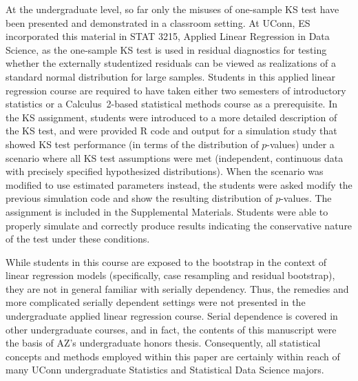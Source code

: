 \documentclass[12pt, letterpaper]{article}
\begin{document}
{%
At the undergraduate level, so far only the misuses of one-sample KS test have 
been presented and demonstrated in a classroom setting. At UConn, ES 
incorporated this material in STAT 3215, Applied Linear Regression in Data 
Science, as the one-sample KS test is used in residual diagnostics for testing 
whether the externally studentized residuals can be viewed as realizations of a 
standard normal distribution for large samples. %
Students in this applied linear regression course are required
to have taken either two semesters of introductory statistics or a 
Calculus~2-based statistical methods course as a prerequisite. In the KS 
assignment, students were introduced to a more detailed description of the KS 
test, and were provided R code and output for a simulation study that showed  
KS test performance (in terms of the distribution of $p$-values) under a 
scenario where all KS test assumptions were met (independent, continuous data 
with precisely specified hypothesized distributions). When the scenario was 
modified to use estimated parameters instead, the students were asked modify the 
previous simulation code and show the resulting distribution of $p$-values. The 
assignment is included in the Supplemental Materials. Students were able to
properly simulate and correctly produce results indicating the conservative 
nature of the test under these conditions. 

While students in this course are exposed to the bootstrap in the 
context of linear regression models (specifically, case resampling and residual 
bootstrap), they are not in general familiar with serially dependency. Thus, the 
remedies and more complicated serially dependent settings were not presented in 
the undergraduate applied linear regression course. Serial dependence is covered 
in other undergraduate courses, and in fact, the contents of this manuscript 
were the basis of AZ's undergraduate honors thesis. Consequently, all 
statistical concepts and methods employed within this paper are certainly within 
reach of many UConn undergraduate Statistics and Statistical Data Science 
majors. 
} \fi
\end{document}
